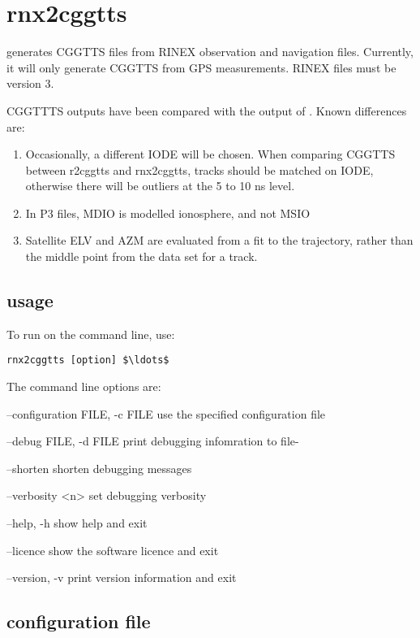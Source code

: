 \section{rnx2cggtts \label{s:rnx2cggtts}}

 generates CGGTTS files from RINEX observation and navigation files.
Currently, it will only generate CGGTTS from GPS measurements. RINEX files must be version 3.

CGGTTTS outputs have been compared with the output of .
Known differences are:
\begin{enumerate}
\item Occasionally, a different IODE will be chosen. When comparing CGGTTS between r2cggtts and rnx2cggtts, 
tracks should be matched on IODE, otherwise there will be outliers at the 5 to 10 ns level.
\item In P3 files, MDIO is modelled ionosphere, and not MSIO
\item Satellite ELV and AZM are evaluated from a fit to the trajectory, rather than the middle point from the data set for a track. 
\end{enumerate}

\subsection{usage}

To run  on the command line, use:
\begin{lstlisting}[mathescape=true]
rnx2cggtts [option] $\ldots$
\end{lstlisting}
The command line options are:
\begin{description*}
	\item[--configuration FILE, -c  FILE] use the specified configuration file
	\item[--debug FILE, -d FILE]	print debugging infomration to file-
	\item[--shorten] shorten debugging messages
	\item[--verbosity \textless{n}\textgreater ]  set debugging verbosity
	\item[--help, -h]	show help and exit
	\item[--licence] show the software licence and exit
	\item[--version, -v]	print version information and exit
\end{description*}

\subsection{configuration file}

